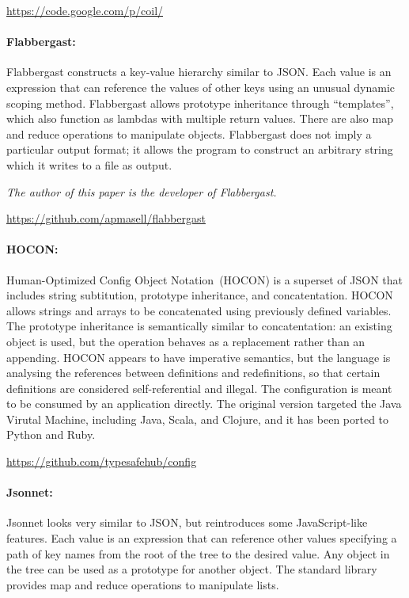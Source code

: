 \documentclass[letterpaper,twocolumn,10pt]{article}
\begin{document}
\noindent \url{https://code.google.com/p/coil/}

\paragraph{Flabbergast:}
Flabbergast constructs a key-value hierarchy similar to JSON. Each value is an expression that can reference the values of other keys using an unusual dynamic scoping method. Flabbergast allows prototype inheritance through ``templates'', which also function as lambdas with multiple return values. There are also map and reduce operations to manipulate objects. Flabbergast does not imply a particular output format; it allows the program to construct an arbitrary string which it writes to a file as output.

\noindent\emph{The author of this paper is the developer of Flabbergast.}

\noindent \url{https://github.com/apmasell/flabbergast}

\paragraph{HOCON:}
Human-Optimized Config Object Notation~(HOCON) is a superset of JSON that includes string subtitution, prototype inheritance, and concatentation. HOCON allows strings and arrays to be concatenated using previously defined variables. The prototype inheritance is semantically similar to concatentation: an existing object is used, but the operation behaves as a replacement rather than an appending. HOCON appears to have imperative semantics, but the language is analysing the references between definitions and redefinitions, so that certain definitions are considered self-referential and illegal. The configuration is meant to be consumed by an application directly. The original version targeted the Java Virutal Machine, including Java, Scala, and Clojure, and it has been ported to Python and Ruby.

\noindent \url{https://github.com/typesafehub/config}

\paragraph{Jsonnet:}
Jsonnet looks very similar to JSON, but reintroduces some JavaScript-like features. Each value is an expression that can reference other values specifying a path of key names from the root of the tree to the desired value. Any object in the tree can be used as a prototype for another object. The standard library provides map and reduce operations to manipulate lists.
\end{document}
